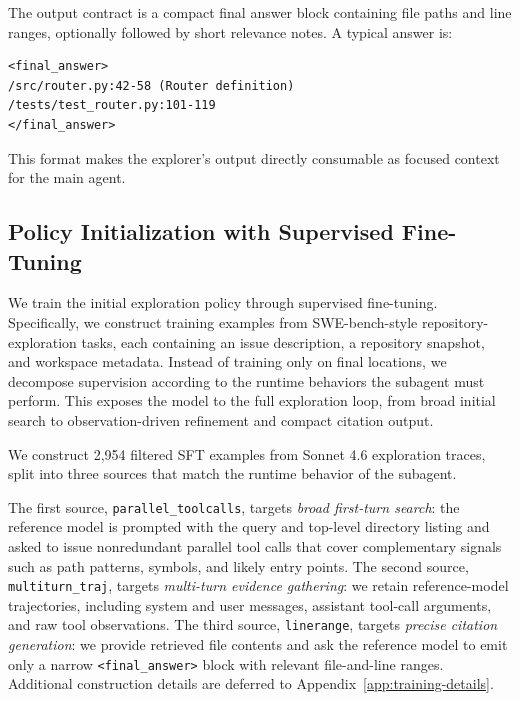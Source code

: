 \documentclass[11pt]{article}
\begin{document}
The output contract is a compact final answer block containing file paths and line ranges, optionally followed by short relevance notes.
A typical answer is:
\begin{verbatim}
<final_answer>
/src/router.py:42-58 (Router definition)
/tests/test_router.py:101-119
</final_answer>
\end{verbatim}
This format makes the explorer's output directly consumable as focused context for the main agent.

\subsection{Policy Initialization with Supervised Fine-Tuning}
\label{sec:sft}

We train the initial exploration policy through supervised fine-tuning. 
Specifically, we construct training examples from SWE-bench-style repository-exploration tasks, each containing an issue description, a repository snapshot, and workspace metadata.
Instead of training only on final locations, we decompose supervision according to the runtime behaviors the subagent must perform.
This exposes the model to the full exploration loop, from broad initial search to observation-driven refinement and compact citation output.

We construct 2,954 filtered SFT examples from Sonnet 4.6 exploration traces, split into three sources that match the runtime behavior of the subagent.


The first source, \texttt{parallel\_toolcalls}, targets \emph{broad first-turn search}: the reference model is prompted with the query and top-level directory listing and asked to issue nonredundant parallel tool calls that cover complementary signals such as path patterns, symbols, and likely entry points.
The second source, \texttt{multiturn\_traj}, targets \emph{multi-turn evidence gathering}: we retain reference-model trajectories, including system and user messages, assistant tool-call arguments, and raw tool observations.
The third source, \texttt{linerange}, targets \emph{precise citation generation}: we provide retrieved file contents and ask the reference model to emit only a narrow \texttt{<final\_answer>} block with relevant file-and-line ranges.
Additional construction details are deferred to Appendix~\ref{app:training-details}.
\end{document}
